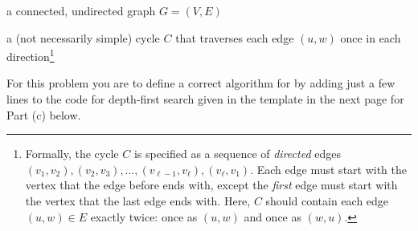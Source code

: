 \documentclass[11pt]{article}
\begin{document}
\begin{mylist}
\item[\bf input:] a connected, undirected graph $G = (V,E)$
\item[\bf output:] a (not necessarily simple) cycle $C$ that traverses each edge $(u, w)$ once in each direction\footnote{
    Formally, the cycle $C$ is specified as a sequence of \emph{directed}
    edges $(v_1, v_2), (v_2, v_3), \ldots, (v_{\ell-1}, v_\ell), (v_\ell, v_1)$.
    Each edge must start with the vertex that the edge before ends with,
    except the \emph{first} edge must start with the vertex that the last edge ends with.
    Here, $C$ should contain each edge $(u,w)\in E$ exactly twice: once as $(u,w)$ and once as $(w, u)$.
  }    
\end{mylist}
For this problem you are to
define a correct algorithm for 
by adding just a few lines to the code for depth-first search given
in the template in the next page for Part (c) below.
\end{document}
